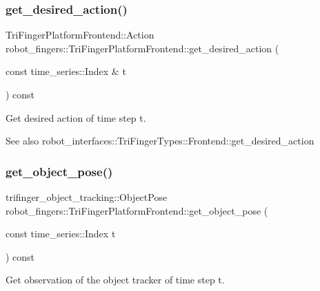 \subsubsection{\texorpdfstring{get\+\_\+desired\+\_\+action()}{get\_desired\_action()}}
{\footnotesize\ttfamily Tri\+Finger\+Platform\+Frontend\+::\+Action robot\+\_\+fingers\+::\+Tri\+Finger\+Platform\+Frontend\+::get\+\_\+desired\+\_\+action (\begin{DoxyParamCaption}\item[{const time\+\_\+series\+::\+Index \&}]{t }\end{DoxyParamCaption}) const}



Get desired action of time step t. 

\begin{DoxySeeAlso}{See also}
robot\+\_\+interfaces\+::\+Tri\+Finger\+Types\+::\+Frontend\+::get\+\_\+desired\+\_\+action 
\end{DoxySeeAlso}
\mbox{\label{classrobot__fingers_1_1TriFingerPlatformFrontend_abb39cc97fbf08af6942f2de3e99e6f54}} 
\subsubsection{\texorpdfstring{get\+\_\+object\+\_\+pose()}{get\_object\_pose()}}
{\footnotesize\ttfamily trifinger\+\_\+object\+\_\+tracking\+::\+Object\+Pose robot\+\_\+fingers\+::\+Tri\+Finger\+Platform\+Frontend\+::get\+\_\+object\+\_\+pose (\begin{DoxyParamCaption}\item[{const time\+\_\+series\+::\+Index}]{t }\end{DoxyParamCaption}) const}



Get observation of the object tracker of time step t. 



